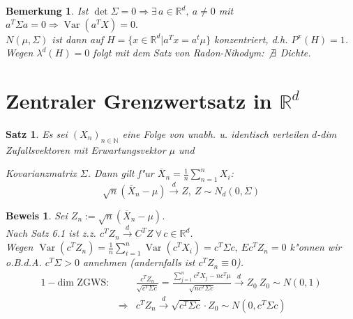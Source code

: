 \documentclass[a4paper,11pt]{book}
\newcommand{\R}{{\mathbb R}}
\newcommand{\N}{{\mathbb N}}
\DeclareMathOperator{\var}{Var}
\def\dto{\stackrel{d}{\rightarrow}}
\newtheorem{Sa}{Satz}[chapter]
\newtheorem*{BemON}{Bemerkung}
\theoremstyle{nonumberplain}
\newtheorem{Bew}{Beweis}
\begin{document}
\begin{BemON}
Ist $\det \Sigma = 0 \Rightarrow \exists\, a \in \R^d,\ a \not= 0$ mit $a^T \Sigma a = 0 \Rightarrow \var(a^T X) = 0.$\\
$N(\mu,\Sigma)$ ist dann auf $H = \{ x \in \R^d | a^T x = a^t \mu \}$ konzentriert, d.h. $P^x(H) = 1$. Wegen $\lambda^d(H) = 0$ folgt mit dem Satz von Radon-Nihodym: $\not\exists$ Dichte.
\end{BemON}


\section{Zentraler Grenzwertsatz in $\R^d$}

\begin{Sa} \label{Sa6.5}
Es sei $(X_n)_{n \in \N}$ eine Folge von unabh. u. identisch verteilen $d$-dim Zufallsvektoren mit Erwartungsvektor $\mu$ und 

Kovarianzmatrix $\Sigma$. Dann gilt f"ur $\overline{X}_n = \frac1{n} \sum_{n=1}^n X_i$:
\[
\sqrt{n} (\overline{X}_n - \mu) \dto Z,\ Z \sim N_d(0,\Sigma)
\]
\end{Sa}

\begin{Bew}
Sei $Z_n := \sqrt{n} (\overline{X}_n - \mu)$.\\
Nach Satz 6.1 ist z.z. $c^T Z_n \dto C^TZ\ \forall\, c \in \R^d$.\\
Wegen $\var(c^T Z_n) = \frac1{n} \sum_{i=1}^n \var(c^T X_i) = c^T \Sigma c,\ Ec^T Z_n = 0$ k"onnen wir o.B.d.A. $c^T \Sigma > 0$ annehmen (andernfalls ist $c^T Z_n \equiv 0$).
\begin{eqnarray*}
1-\text{dim ZGWS}: & & \frac{c^T Z_n}{\sqrt{c^T \Sigma c}} = \frac{\sum_{j=1}^n c^T X_j - n c^T \mu}{\sqrt{n c^T \Sigma c}} \dto Z_0 \ Z_0 \sim N(0,1) \\
& \Rightarrow & c^T Z_n \dto \sqrt{c^T \Sigma c} \cdot Z_0 \sim N(0,c^T \Sigma c)
\end{eqnarray*}
\end{Bew}
\end{document}
